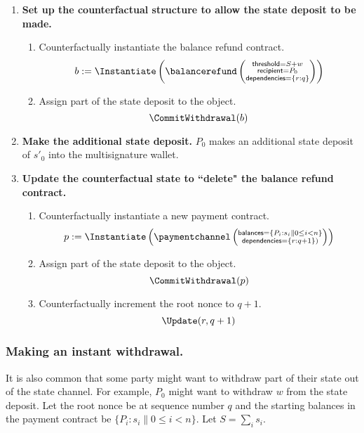 \documentclass[prb,floatfix,reprint,nofootinbib,amsmath,amssymb,epsfig,pre,floats,letterpaper,groupedaffiliation,tightenlines,allcolors=blue,11pt]{revtex4}
\theoremstyle{definition}
\theoremstyle{definition}
\theoremstyle{definition}
\begin{document}
\begin{enumerate}

\item \textbf{Set up the counterfactual structure to allow the state deposit to be made.}

\begin{enumerate}

\item Counterfactually instantiate the balance refund contract.
    \[
    b := \Instantiate\left(
    \balancerefund\left(\substack{
    \textsf{threshold}=S+w \\
    \textsf{recipient}=P_0 \\
    \textsf{dependencies}=\left\{r:q\right\}
    }\right)
    \right)
\]

\item Assign part of the state deposit to the object.
\[
    \CommitWithdrawal(b)
\]

\end{enumerate}

\item \textbf{Make the additional state deposit.}
$P_0$ makes an additional state deposit of $s'_0$ into the multisignature wallet.

\item \textbf{Update the counterfactual state to ``delete" the balance refund contract.}

\begin{enumerate}

\item Counterfactually instantiate a new payment contract.
\[
    p := \Instantiate\left(\paymentchannel\left(\substack{
    \textsf{balances}=\{P_i:s_i \| 0 \le i < n\}\\
    \textsf{dependencies}=\left\{r:q+1\right\})
    }\right)
    \right)
\]

\item Assign part of the state deposit to the object.
\[
    \CommitWithdrawal(p)
\]

\item Counterfactually increment the root nonce to $q + 1$.
\[
\Update(r, q+1)
\]
\end{enumerate}

\end{enumerate}

\subsubsection{Making an instant withdrawal.}
It is also common that some party might want to withdraw part of their state out of the state channel. For example, $P_0$ might want to withdraw $w$ from the state deposit. Let the root nonce be at sequence number $q$ and the starting balances in the payment contract be
$\{P_i : s_i \| 0 \le i < n\}$. Let $S = \sum_i s_i$.
\end{document}
